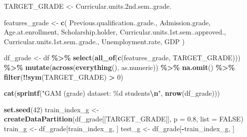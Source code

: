 \documentclass[
]{article}
\newenvironment{Shaded}{\begin{snugshade}}{\end{snugshade}}
\newcommand{\AttributeTok}[1]{\textcolor[rgb]{0.13,0.29,0.53}{#1}}
\newcommand{\ConstantTok}[1]{\textcolor[rgb]{0.56,0.35,0.01}{#1}}
\newcommand{\DecValTok}[1]{\textcolor[rgb]{0.00,0.00,0.81}{#1}}
\newcommand{\FloatTok}[1]{\textcolor[rgb]{0.00,0.00,0.81}{#1}}
\newcommand{\FunctionTok}[1]{\textcolor[rgb]{0.13,0.29,0.53}{\textbf{#1}}}
\newcommand{\NormalTok}[1]{#1}
\newcommand{\OtherTok}[1]{\textcolor[rgb]{0.56,0.35,0.01}{#1}}
\newcommand{\SpecialCharTok}[1]{\textcolor[rgb]{0.81,0.36,0.00}{\textbf{#1}}}
\newcommand{\StringTok}[1]{\textcolor[rgb]{0.31,0.60,0.02}{#1}}
\begin{document}
\begin{Shaded}
\begin{Highlighting}[]
\NormalTok{TARGET\_GRADE }\OtherTok{\textless{}{-}} \StringTok{\textquotesingle{}Curricular.units.2nd.sem..grade.\textquotesingle{}}

\NormalTok{features\_grade }\OtherTok{\textless{}{-}} \FunctionTok{c}\NormalTok{(}
  \StringTok{\textquotesingle{}Previous.qualification..grade.\textquotesingle{}}\NormalTok{,}
  \StringTok{\textquotesingle{}Admission.grade\textquotesingle{}}\NormalTok{,}
  \StringTok{\textquotesingle{}Age.at.enrollment\textquotesingle{}}\NormalTok{,}
  \StringTok{\textquotesingle{}Scholarship.holder\textquotesingle{}}\NormalTok{,}
  \StringTok{\textquotesingle{}Curricular.units.1st.sem..approved.\textquotesingle{}}\NormalTok{,}
  \StringTok{\textquotesingle{}Curricular.units.1st.sem..grade.\textquotesingle{}}\NormalTok{,}
  \StringTok{\textquotesingle{}Unemployment.rate\textquotesingle{}}\NormalTok{,}
  \StringTok{\textquotesingle{}GDP\textquotesingle{}}
\NormalTok{)}

\NormalTok{df\_grade }\OtherTok{\textless{}{-}}\NormalTok{ df }\SpecialCharTok{\%\textgreater{}\%}
  \FunctionTok{select}\NormalTok{(}\FunctionTok{all\_of}\NormalTok{(}\FunctionTok{c}\NormalTok{(features\_grade, TARGET\_GRADE))) }\SpecialCharTok{\%\textgreater{}\%}
  \FunctionTok{mutate}\NormalTok{(}\FunctionTok{across}\NormalTok{(}\FunctionTok{everything}\NormalTok{(), as.numeric)) }\SpecialCharTok{\%\textgreater{}\%}
  \FunctionTok{na.omit}\NormalTok{() }\SpecialCharTok{\%\textgreater{}\%}
  \FunctionTok{filter}\NormalTok{(}\SpecialCharTok{!!}\FunctionTok{sym}\NormalTok{(TARGET\_GRADE) }\SpecialCharTok{\textgreater{}} \DecValTok{0}\NormalTok{)}

\FunctionTok{cat}\NormalTok{(}\FunctionTok{sprintf}\NormalTok{(}\StringTok{"GAM (grade) dataset: \%d students}\SpecialCharTok{\textbackslash{}n}\StringTok{"}\NormalTok{, }\FunctionTok{nrow}\NormalTok{(df\_grade)))}

\FunctionTok{set.seed}\NormalTok{(}\DecValTok{42}\NormalTok{)}
\NormalTok{train\_index\_g }\OtherTok{\textless{}{-}} \FunctionTok{createDataPartition}\NormalTok{(df\_grade[[TARGET\_GRADE]], }\AttributeTok{p =} \FloatTok{0.8}\NormalTok{, }\AttributeTok{list =} \ConstantTok{FALSE}\NormalTok{)}
\NormalTok{train\_g }\OtherTok{\textless{}{-}}\NormalTok{ df\_grade[train\_index\_g, ]}
\NormalTok{test\_g }\OtherTok{\textless{}{-}}\NormalTok{ df\_grade[}\SpecialCharTok{{-}}\NormalTok{train\_index\_g, ]}


\end{Highlighting}
\end{Shaded}
\end{document}
